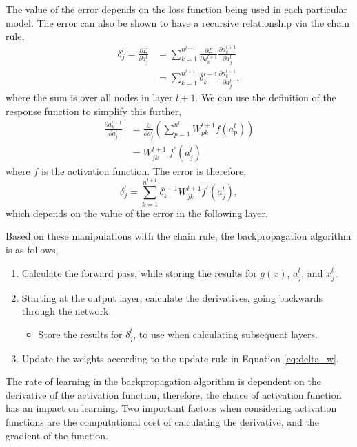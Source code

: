 The value of the error depends on the loss function being used in each 
particular model. The error can also be shown to have a recursive relationship 
via the chain rule,
\begin{align*}
		\delta^l_j = \frac{\partial L}{\partial a^l_j} &= \sum_{k=1}^{n^{l+1}} 
		\frac{\partial L}{\partial a^{l+1}_{k}}\frac{\partial a^{l+1}_k}{\partial 
		a^l_j}\\ 
		&= \sum^{n^{l+1}}_{k = 1} \delta^{l+1}_k \frac{\partial a^{l+1}_k}{\partial 
		a^l_j},
\end{align*}
where the sum is over all nodes in layer $l+1$. We can use the definition of the
response function to simplify this further,
\begin{align*}
		\frac{\partial a^{l+1}_k}{\partial a^l_j} &= \frac{\partial}{\partial a^l_j} 
		\left( \sum^{n^l}_{p=1} W^{l+1}_{pk} f(a^l_p) \right) \\ 
		&= W^{l+1}_{jk} \; f^\prime(a^l_j)
\end{align*}
where $f$ is the activation function. The error is therefore,
\begin{equation*}
	\delta^l_j = \sum^{n^{l+1}}_{k=1} \delta^{l+1}_k W^{l+1}_{jk} f^\prime(a^l_j),
\end{equation*}
which depends on the value of the error in the following layer.

Based on these manipulations with the chain rule, the backpropagation 
algorithm is as follows,
\begin{enumerate}
	\item Calculate the forward pass, while storing the results for $g(x)$, 
		$a^l_j$, and $x^l_j$.
	\item Starting at the output layer, calculate the derivatives, going backwards
		through the network. 
	\begin{itemize}
		\item Store the results for $\delta^l_j$, to use when calculating subsequent
			layers.
	\end{itemize}
	\item Update the weights according to the update rule in Equation
		\ref{eq:delta_w}.
\end{enumerate}

\bigskip

The rate of learning in the backpropagation algorithm is dependent on the
derivative of the activation function, therefore, the choice of activation
function has an impact on learning. Two important factors when considering
activation functions are the computational cost of calculating the derivative,
and the gradient of the function. 

